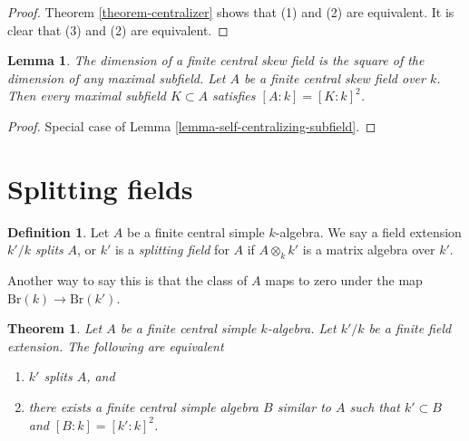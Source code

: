 \documentclass{stacks-project}
\newenvironment{slogan}{\comment}{\endcomment}
\theoremstyle{plain}
\newtheorem{theorem}[subsection]{Theorem}
\newtheorem{lemma}[subsection]{Lemma}
\theoremstyle{definition}
\newtheorem{definition}[subsection]{Definition}
\theoremstyle{remark}
\numberwithin{equation}{subsection}
\begin{document}
\begin{proof}
Theorem \ref{theorem-centralizer}
shows that (1) and (2) are equivalent.
It is clear that (3) and (2) are equivalent.
\end{proof}

\begin{lemma}
\label{lemma-maximal-subfield}
\begin{slogan}
The dimension of a finite central skew field is the square of the dimension
of any maximal subfield.
\end{slogan}
Let $A$ be a finite central skew field over $k$.
Then every maximal subfield $K \subset A$ satisfies
$[A : k] = [K : k]^2$.
\end{lemma}

\begin{proof}
Special case of Lemma \ref{lemma-self-centralizing-subfield}.
\end{proof}





\section{Splitting fields}
\label{section-splitting}


\begin{definition}
\label{definition-splitting}
Let $A$ be a finite central simple $k$-algebra.
We say a field extension $k'/k$ {\it splits} $A$, or
$k'$ is a {\it splitting field} for $A$ if $A \otimes_k k'$ is
a matrix algebra over $k'$.
\end{definition}

\noindent
Another way to say this is that the class of $A$ maps to zero
under the map $\text{Br}(k) \to \text{Br}(k')$.

\begin{theorem}
\label{theorem-splitting}
Let $A$ be a finite central simple $k$-algebra.
Let $k'/k$ be a finite field extension.
The following are equivalent
\begin{enumerate}
\item $k'$ splits $A$, and
\item there exists a finite central simple algebra $B$ similar to $A$
such that $k' \subset B$ and $[B : k] = [k' : k]^2$.
\end{enumerate}
\end{theorem}
\end{document}
